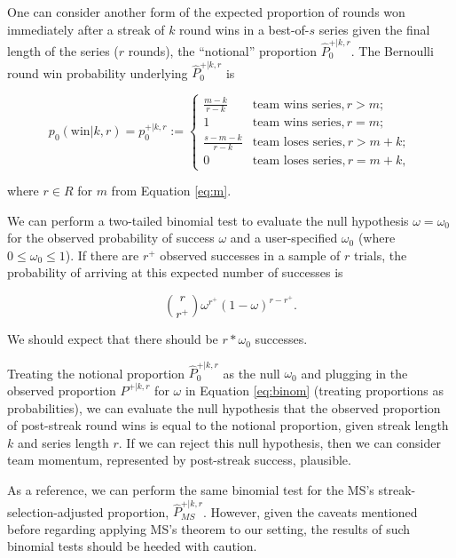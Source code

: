 \documentclass{article}
\begin{document}
One can consider another form of the expected proportion of rounds won
immediately after a streak of \(k\) round wins in a best-of-\(s\) series
given the final length of the series (\(r\) rounds), the ``notional''
proportion \(\hat{P}^{+|k,r}_0\). The Bernoulli round win probability
underlying \(\hat{P}^{+|k,r}_0\) is

\begin{equation}\label{eq:pwkr}
p_0(\text{win} | k, r) = p^{+|k,r}_0 := \begin{cases}
  \frac{m - k}{r - k} & \text{team wins series}, r > m; \\
  1 & \text{team wins series}, r = m; \\
  \frac{s - m - k}{r - k} & \text{team loses series}, r > m + k; \\
  0 & \text{team loses series}, r = m + k,
\end{cases}
\end{equation}

where \(r \in R\) for \(m\) from Equation \ref{eq:m}.

We can perform a two-tailed binomial test to evaluate the null
hypothesis \(\omega = \omega_0\) for the observed probability of success
\(\omega\) and a user-specified \(\omega_0\) (where
\(0 \leq \omega_0 \leq 1\)). If there are \(r^+\) observed successes in
a sample of \(r\) trials, the probability of arriving at this expected
number of successes is

\begin{equation}\label{eq:binom}
\binom {r}{r^+} \omega^{r^+}(1-\omega)^{r-r^+}.
\end{equation}

We should expect that there should be \(r * \omega_0\) successes.

Treating the notional proportion \(\hat{P}^{+|k,r}_0\) as the null
\(\omega_0\) and plugging in the observed proportion \(P^{+|k,r}\) for
\(\omega\) in Equation \ref{eq:binom} (treating proportions as
probabilities), we can evaluate the null hypothesis that the observed
proportion of post-streak round wins is equal to the notional
proportion, given streak length \(k\) and series length \(r\). If we can
reject this null hypothesis, then we can consider team momentum,
represented by post-streak success, plausible.

As a reference, we can perform the same binomial test for the MS's
streak-selection-adjusted proportion, \(\hat{P}^{+|k,r}_{MS}\). However,
given the caveats mentioned before regarding applying MS's theorem to
our setting, the results of such binomial tests should be heeded with
caution.
\end{document}
